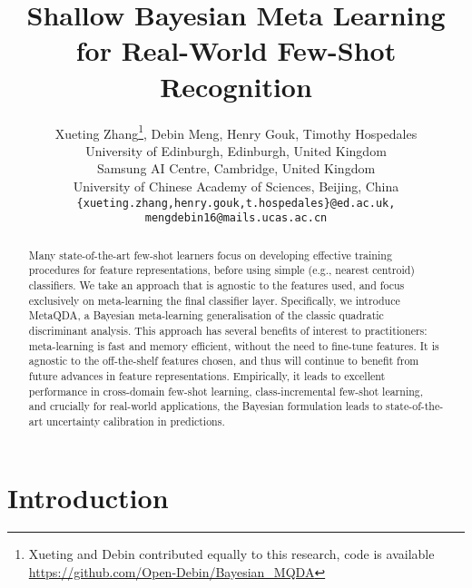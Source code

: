 \documentclass[10pt,twocolumn,letterpaper]{article}
\begin{document}
\title{Shallow Bayesian Meta Learning for Real-World Few-Shot Recognition}

\author{Xueting Zhang\thanks{Xueting and Debin contributed equally to this research, code is available \url{https://github.com/Open-Debin/Bayesian_MQDA} }, 
Debin Meng, Henry Gouk, Timothy Hospedales
\\
University of Edinburgh, Edinburgh, United Kingdom\\
Samsung AI Centre, Cambridge, United Kingdom\\
University of Chinese Academy of Sciences, Beijing, China \\
{\tt\small \{xueting.zhang,henry.gouk,t.hospedales\}@ed.ac.uk, mengdebin16@mails.ucas.ac.cn}
}



\maketitle
\ificcvfinal\thispagestyle{empty}\fi

\begin{abstract}
Many state-of-the-art few-shot learners focus on developing effective training procedures for feature representations, before using simple (e.g., nearest centroid) classifiers. We take an approach that is agnostic to the features used, and focus exclusively on meta-learning the final classifier layer. Specifically, we introduce MetaQDA, a Bayesian meta-learning generalisation of the classic quadratic discriminant analysis. This approach has several benefits of interest to practitioners: meta-learning is fast and memory efficient, without the need to fine-tune features. It is agnostic to the off-the-shelf features chosen, and thus will continue to benefit from future advances in feature representations. Empirically, it leads to excellent performance in cross-domain few-shot learning, class-incremental few-shot learning, and crucially for real-world applications, the Bayesian formulation leads to state-of-the-art uncertainty calibration in predictions.
\end{abstract}

\section{Introduction}
\end{document}
